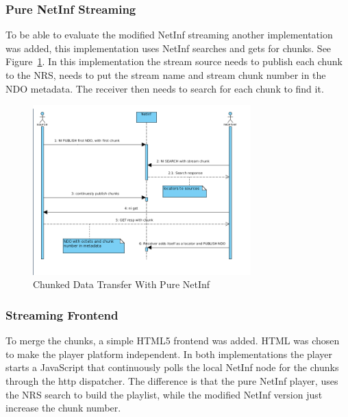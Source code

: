 \subsubsection{Pure NetInf Streaming}
To be able to evaluate the modified NetInf streaming another implementation was added, this implementation uses NetInf searches and gets for chunks. See Figure~\ref{fig:stream-seq-pure}. In this implementation the stream source needs to publish each chunk to the NRS, needs to put the stream name and stream chunk number in the NDO metadata. The receiver then needs to search for each chunk to find it. 

\begin{figure}[h!]
	\centering
		\includegraphics[width=0.75\textwidth]{./img/sequence_diagram_pure_streaming.png}
    	\caption{Chunked Data Transfer With Pure NetInf}
	\label{fig:stream-seq-pure}
\end{figure}

\subsubsection{Streaming Frontend}
To merge the chunks, a simple HTML5 frontend was added. HTML was chosen to make the player platform independent.
In both implementations the player starts a JavaScript that continuously polls the local NetInf node for the chunks through the http dispatcher.
The difference is that the pure NetInf player, uses the NRS search to build the playlist, while the modified NetInf version just increase the chunk number.
